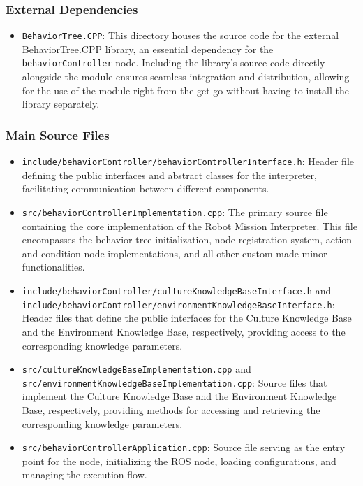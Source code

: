 \documentclass{CSSRforAfrica}
\begin{document}
\subsubsection{External Dependencies}
\begin{itemize}
    \item \texttt{\small BehaviorTree.CPP}: This directory houses the source code for the external \textnormal{BehaviorTree.CPP} library, an essential dependency for the \texttt{\small behaviorController} node. Including the library's source code directly alongside the module ensures seamless integration and distribution, allowing for the use of the module right from the get go without having to install the library separately.
\end{itemize}

\subsubsection{Main Source Files}
\begin{itemize}
    \item \texttt{\small include/behaviorController/\textnormal{behaviorControllerInterface.h}}: Header file \\ defining the public interfaces and abstract classes for the interpreter, facilitating communication between different components.

    \item \texttt{\small src/\textnormal{behaviorControllerImplementation.cpp}}: The primary source file containing the core implementation of the Robot Mission Interpreter. This file encompasses the behavior tree initialization, node registration system, action and condition node implementations, and all other custom made minor functionalities.

    \item \texttt{\small include/behaviorController/\textnormal{cultureKnowledgeBaseInterface.h}} and \\ \texttt{\small include/behaviorController/\textnormal{environmentKnowledgeBaseInterface.h}}: Header files that define the public interfaces for the Culture Knowledge Base and the Environment Knowledge Base, respectively, providing access to the corresponding knowledge parameters.

    \item \texttt{\small src/\textnormal{cultureKnowledgeBaseImplementation.cpp}} and \\ \texttt{\small src/\textnormal{environmentKnowledgeBaseImplementation.cpp}}: Source files that implement the Culture Knowledge Base and the Environment Knowledge Base, respectively, providing methods for accessing and retrieving the corresponding knowledge parameters.

    \item \texttt{\small src/\textnormal{behaviorControllerApplication.cpp}}: Source file serving as the entry point for the node, initializing the ROS node, loading configurations, and managing the execution flow.
\end{itemize}
\end{document}
